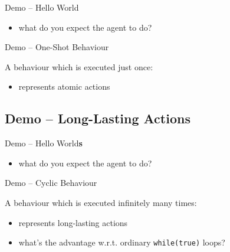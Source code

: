 \documentclass{beamer}\mode<presentation>{\usetheme{AMSCesenaPurpleAndGold}}
\begin{document}
\begin{frame}{Demo \currentDemo{} -- Hello World}
    
    \begin{itemize}
        \item what do you expect the agent to do?
    \end{itemize}
\end{frame}

\begin{frame}{Demo \currentDemo{} -- One-Shot Behaviour}

    A behaviour which is executed just once:
    \vfill
    
    \begin{itemize}
        \item represents \alert{atomic} actions
    \end{itemize}
\end{frame}

\startDemo

\subsection{Demo \currentDemo{} -- Long-Lasting Actions}

\begin{frame}{Demo \currentDemo{} -- Hello World\textbf{s}}
    
    \begin{itemize}
        \item what do you expect the agent to do?
    \end{itemize}
\end{frame}

\begin{frame}{Demo \currentDemo{} -- Cyclic Behaviour}

    A behaviour which is executed infinitely many times:
    \vfill
    
    \begin{itemize}
        \item represents \alert{long-lasting} actions
        \item what's the advantage w.r.t. ordinary \texttt{while(true)} loops?
    \end{itemize}
\end{frame}
\end{document}
